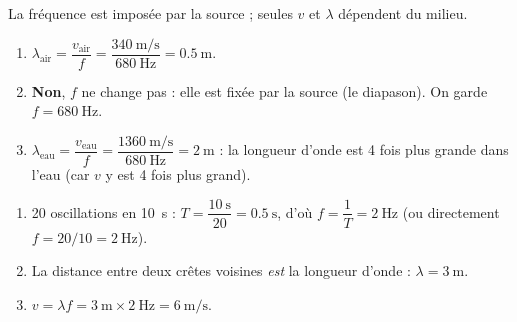 \documentclass[11pt,a4paper]{article}
\begin{document}
\begin{corrige}
La fréquence est imposée par la source ; seules $v$ et $\lambda$ dépendent du milieu.
\begin{enumerate}[label=\alph*)]
  \item $\lambda_{\text{air}}=\dfrac{v_{\text{air}}}{f}
        =\dfrac{\SI{340}{\metre\per\second}}{\SI{680}{\hertz}}=\SI{0.5}{\metre}.$
  \item \textbf{Non}, $f$ ne change pas : elle est fixée par la source (le diapason). On garde
        $f=\SI{680}{\hertz}$.
  \item $\lambda_{\text{eau}}=\dfrac{v_{\text{eau}}}{f}
        =\dfrac{\SI{1360}{\metre\per\second}}{\SI{680}{\hertz}}=\SI{2}{\metre}$ :
        la longueur d'onde est 4 fois plus grande dans l'eau (car $v$ y est 4 fois plus grand).
\end{enumerate}
\end{corrige}

\begin{corrige}
\begin{enumerate}[label=\alph*)]
  \item 20 oscillations en \SI{10}{\second} :
        $T=\dfrac{\SI{10}{\second}}{20}=\SI{0.5}{\second}$, d'où
        $f=\dfrac{1}{T}=\SI{2}{\hertz}$ (ou directement $f=20/10=\SI{2}{\hertz}$).
  \item La distance entre deux crêtes voisines \emph{est} la longueur d'onde :
        $\lambda=\SI{3}{\metre}.$
  \item $v=\lambda f=\SI{3}{\metre}\times\SI{2}{\hertz}=\SI{6}{\metre\per\second}.$
\end{enumerate}
\end{corrige}
\end{document}
